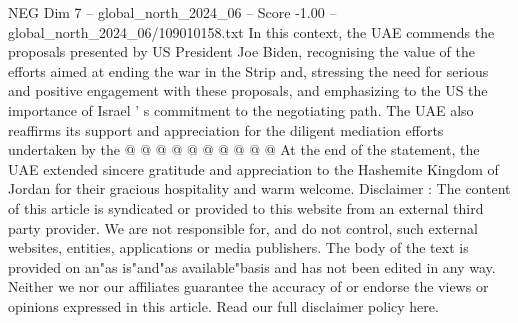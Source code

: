 \begin{textsample}{NEG Dim 7 – global\_north\_2024\_06 – Score -1.00 – global\_north\_2024\_06/109010158.txt}
In this context, the UAE commends the proposals presented by US President Joe Biden, recognising the value of the efforts aimed at ending the war in the Strip and, stressing the need for serious and positive engagement with these proposals, and emphasizing to the US the importance of Israel ' s commitment to the negotiating path.
The UAE also reaffirms its support and appreciation for the diligent mediation efforts undertaken by the @ @ @ @ @ @ @ @ @ @ At the end of the statement, the UAE extended sincere gratitude and appreciation to the Hashemite Kingdom of Jordan for their gracious hospitality and warm welcome.
Disclaimer : The content of this article is syndicated or provided to this website from an external third party provider.
We are not responsible for, and do not control, such external websites, entities, applications or media publishers.
The body of the text is provided on an"as is"and"as available"basis and has not been edited in any way.
Neither we nor our affiliates guarantee the accuracy of or endorse the views or opinions expressed in this article.
Read our full disclaimer policy here.

\end{textsample}
